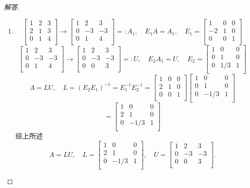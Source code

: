 \documentclass[UTF8]{ctexart}
\begin{document}
\begin{proof}[解答]
\begin{enumerate}
\item
\[
 \begin{bmatrix}
1&2 &3 \\
2&1 &3\\
0&1&4\\
\end{bmatrix}\longrightarrow \begin{bmatrix}
1&2 &3 \\
0&-3 &-3\\
0&1&4\\
\end{bmatrix}=:A_1, \quad E_1 A=A_1, \quad E_1=  \begin{bmatrix}
1&0 &0 \\
-2&1 &0\\
0&0&1\\
\end{bmatrix}
\]
\[
\begin{bmatrix}
1&2 &3 \\
0&-3 &-3\\
0&1&4\\
\end{bmatrix}\longrightarrow \begin{bmatrix}
1&2 &3 \\
0&-3 &-3\\
0&0&3\\
\end{bmatrix}=:U, \quad E_2A_1=U, \quad E_2=  \begin{bmatrix}
1&0 &0 \\
0&1 &0\\
0&1/3&1\\
\end{bmatrix}
\]
\[
A=LU,\quad L=(E_2E_1)^{-1}=E_1^{-1}E_2^{-1}= \begin{bmatrix}
1&0 &0 \\
 2&1 &0\\
0&0&1\\
\end{bmatrix} \begin{bmatrix}
1&0 &0 \\
0&1 &0\\
0&-1/3&1\\
\end{bmatrix}
\]
\[
= \begin{bmatrix}
1&0 &0 \\
 2&1 &0\\
0&-1/3&1\\
\end{bmatrix}
\]
综上所述
\[
A=LU, \quad L= \begin{bmatrix}
1&0 &0 \\
 2&1 &0\\
0&-1/3&1\\
\end{bmatrix}, \quad U=  \begin{bmatrix}
1&2 &3 \\
0&-3 &-3\\
0&0&3\\
\end{bmatrix}.
\]


\end{enumerate}
\end{proof}
\end{document}
